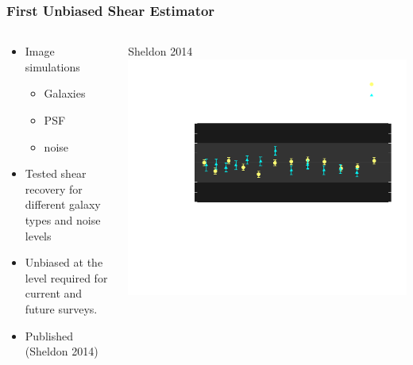 \documentclass{beamer}
\begin{document}
\frame
{
    \frametitle{First Unbiased Shear Estimator}

    \begin{columns}
        \begin{column}{0.5\textwidth}    
            \begin{itemize}

                \item Image simulations
                    \begin{itemize}
                        \item Galaxies
                        \item PSF
                        \item noise
                    \end{itemize}

                \item Tested shear recovery for different galaxy types
                    and noise levels

                \item Unbiased at the level required for current and future surveys.

                \item {\color{gold} Published (Sheldon 2014)}

            \end{itemize}
        \end{column}
        \begin{column}{0.5\textwidth}    
            \begin{center}
                \hfill {\tiny Sheldon 2014}
                \newline
            \includegraphics[width=\textwidth]{ngmix-flux-s2n-sigrat-20-invert.pdf}
            \end{center}
        \end{column}
    \end{columns}
}
\end{document}
